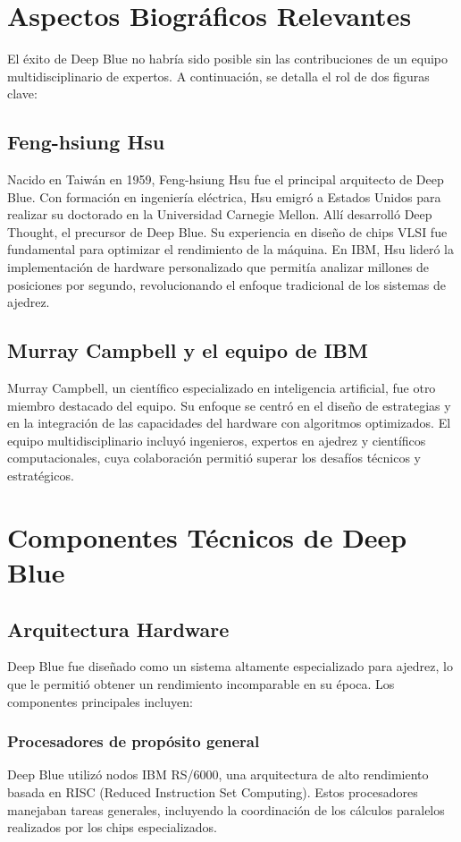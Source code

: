 \documentclass[12pt,a4paper]{article}
\begin{document}
\section{Aspectos Biográficos Relevantes}
El éxito de Deep Blue no habría sido posible sin las contribuciones de un equipo multidisciplinario de expertos. A continuación, se detalla el rol de dos figuras clave:

\subsection*{Feng-hsiung Hsu}
Nacido en Taiwán en 1959, Feng-hsiung Hsu fue el principal arquitecto de Deep Blue. Con formación en ingeniería eléctrica, Hsu emigró a Estados Unidos para realizar su doctorado en la Universidad Carnegie Mellon. Allí desarrolló Deep Thought, el precursor de Deep Blue. Su experiencia en diseño de chips VLSI fue fundamental para optimizar el rendimiento de la máquina. En IBM, Hsu lideró la implementación de hardware personalizado que permitía analizar millones de posiciones por segundo, revolucionando el enfoque tradicional de los sistemas de ajedrez.

\subsection*{Murray Campbell y el equipo de IBM}
Murray Campbell, un científico especializado en inteligencia artificial, fue otro miembro destacado del equipo. Su enfoque se centró en el diseño de estrategias y en la integración de las capacidades del hardware con algoritmos optimizados. El equipo multidisciplinario incluyó ingenieros, expertos en ajedrez y científicos computacionales, cuya colaboración permitió superar los desafíos técnicos y estratégicos.

\section{Componentes Técnicos de Deep Blue}

\subsection{Arquitectura Hardware}
Deep Blue fue diseñado como un sistema altamente especializado para ajedrez, lo que le permitió obtener un rendimiento incomparable en su época. Los componentes principales incluyen:

\subsubsection*{Procesadores de propósito general}
Deep Blue utilizó nodos IBM RS/6000, una arquitectura de alto rendimiento basada en RISC (Reduced Instruction Set Computing). Estos procesadores manejaban tareas generales, incluyendo la coordinación de los cálculos paralelos realizados por los chips especializados.
\end{document}
